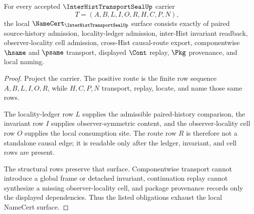 \begin{theorem}
\label{thm:inter-hist-transport-seal-namecert-obligations}
For every accepted $\InterHistTransportSealUp$ carrier
$$
T=(A,B,L,I,O,R,H,C,P,N),
$$
the local $\NameCert_{\InterHistTransportSealUp}$ surface consists exactly of paired source-history admission, locality-ledger admission, inter-Hist invariant readback, observer-locality cell admission, cross-Hist causal-route export, componentwise $\hsame$ and $\psame$ transport, displayed $\Cont$ replay, $\Pkg$ provenance, and local naming.
\end{theorem}
\begin{proof}
Project the carrier. The positive route is the finite row sequence $A,B,L,I,O,R$, while $H,C,P,N$ transport, replay, locate, and name those same rows.

The locality-ledger row $L$ supplies the admissible paired-history comparison, the invariant row $I$ supplies observer-symmetric content, and the observer-locality cell row $O$ supplies the local consumption site. The route row $R$ is therefore not a standalone causal edge; it is readable only after the ledger, invariant, and cell rows are present.

The structural rows preserve that surface. Componentwise transport cannot introduce a global frame or detached invariant, continuation replay cannot synthesize a missing observer-locality cell, and package provenance records only the displayed dependencies. Thus the listed obligations exhaust the local NameCert surface.
\end{proof}

